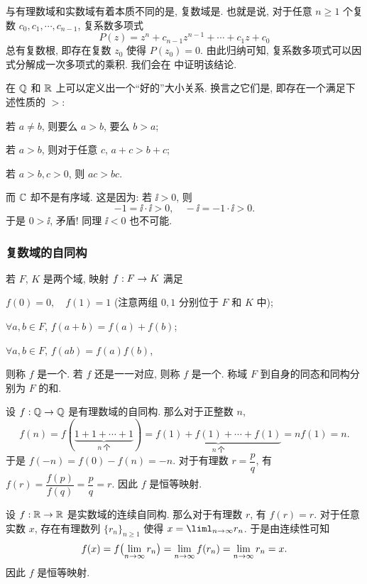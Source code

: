 与有理数域和实数域有着本质不同的是, 复数域是.
也就是说, 对于任意 $n\ge 1$ 个复数 $c_0,c_1,\cdots,c_{n-1}$, 复系数多项式
\[
  P(z)=z^n+c_{n-1}z^{n-1}+\cdots+c_1z+c_0
\]
总有复数根, 即存在复数 $z_0$ 使得 $P(z_0)=0$.
由此归纳可知, 复系数多项式可以因式分解成一次多项式的乘积.
我们会在 中证明该结论.

在 ${\mathbb{Q}}$ 和 ${\mathbb{R}}$ 上可以定义出一个``好的''大小关系.
换言之它们是, 即存在一个满足下述性质的 $>$:
\begin{enuma}
  \item 若 $a\neq b$, 则要么 $a>b$, 要么 $b>a$;
  \item 若 $a>b$, 则对于任意 $c$, $a+c>b+c$;
  \item 若 $a>b,c>0$, 则 $ac>bc$.
\end{enuma}\parnoindent
而 \alert{${\mathbb{C}}$ 却不是有序域}.
这是因为: 若 $\ii>0$, 则
\[
  -1=\ii\cdot \ii>0,\quad -\ii=-1\cdot \ii>0.
\]
于是 $0>\ii$, 矛盾! 同理 $\ii<0$ 也不可能.


\subsubsection{复数域的自同构}
\label{sssec:complex-field-isomorphism}

若 $F$, $K$ 是两个域, 映射 $f:F\rightarrow K$ 满足
\begin{enuma}
  \item $f(0)=0,\quad f(1)=1$ (注意两组 $0,1$ 分别位于 $F$ 和 $K$ 中);
  \item $\forall a,b\in F$, $f(a+b)=f(a)+f(b)$;
  \item $\forall a,b\in F$, $f(ab)=f(a)f(b)$,
\end{enuma}\parnoindent
则称 $f$ 是一个.
若 $f$ 还是一一对应, 则称 $f$ 是一个.
称域 $F$ 到自身的同态和同构分别为 $F$ 的和.

\begin{exampleenum}
  \item 设 $f:{\mathbb{Q}}\rightarrow{\mathbb{Q}}$ 是有理数域的自同构. 那么对于正整数 $n$,
  \[
      f(n)
    =f(\underbrace{1+1+\cdots+1}_{n\ \text{个}})
    =\underbrace{f(1)+f(1)+\cdots+f(1)}_{n\ \text{个}}
    =nf(1)=n.
  \]
  于是 $f(-n)=f(0)-f(n)=-n$.
  对于有理数 $r=\dfrac pq$, 有 $f(r)=\dfrac{f(p)}{f(q)}=\dfrac pq=r$.
  因此 $f$ 是恒等映射.
  \item 设 $f:{\mathbb{R}}\rightarrow{\mathbb{R}}$ 是实数域的连续自同构. 那么对于有理数 $r$, 有 $f(r)=r$.
  对于任意实数 $x$, 存在有理数列 $\{r_n\}_{n\ge 1}$ 使得 $x=\liml_{n\ra\infty} r_n$.
  于是由连续性可知
  \[
      f(x)
    =f\bigl(\lim_{n\rightarrow\infty} r_n\bigr)
    =\lim_{n\rightarrow\infty} f(r_n)
    =\lim_{n\rightarrow\infty} r_n
    =x.
  \]
  因此 $f$ 是恒等映射.
\end{exampleenum}

